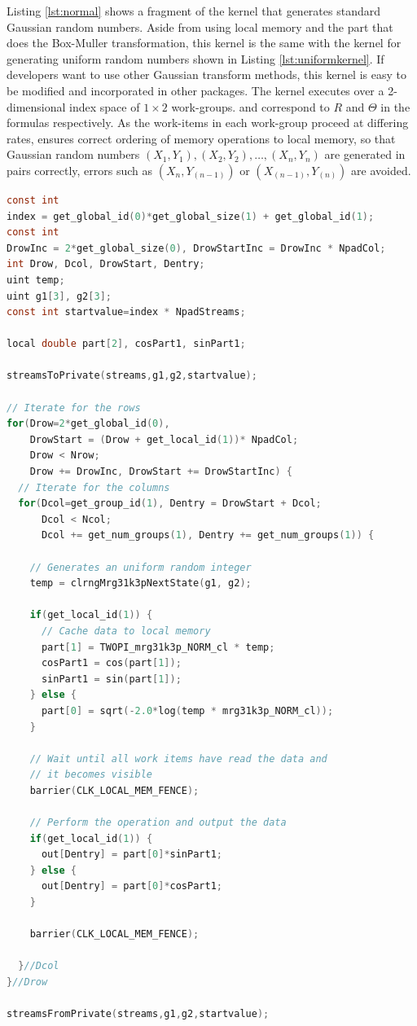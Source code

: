 \documentclass[article,nojss]{jss}\usepackage[]{graphicx}\usepackage[]{color}
\begin{document}
Listing \ref{lst:normal} shows a fragment of the kernel that generates standard Gaussian random numbers. Aside from using local memory and the part that does the Box-Muller transformation, this kernel is the same with the kernel for generating uniform random numbers shown in Listing \ref{lst:uniformkernel}. If developers want to use other Gaussian transform methods, this kernel is easy to be modified and incorporated in other  packages. The kernel executes over a 2-dimensional index space of $1 \times 2$ work-groups.  and  correspond to $R$ and $\Theta$ in the formulas respectively. As the work-items in each work-group proceed at differing rates,  ensures correct ordering of memory operations to local memory, so that Gaussian random numbers $(X_1,Y_1), (X_2,Y_2), \dots, (X_n,Y_n)$ are generated in pairs correctly, errors such as $(X_n, Y_{(n-1)})$ or $(X_{(n-1)}, Y_{(n)})$ are avoided.
%
\begin{framed}
\begin{lstlisting}[language=C,basicstyle=\small,caption={name},label={lst:normal}]
const int 
index = get_global_id(0)*get_global_size(1) + get_global_id(1);
const int 
DrowInc = 2*get_global_size(0), DrowStartInc = DrowInc * NpadCol;
int Drow, Dcol, DrowStart, Dentry;
uint temp;
uint g1[3], g2[3];
const int startvalue=index * NpadStreams;

local double part[2], cosPart1, sinPart1;

streamsToPrivate(streams,g1,g2,startvalue);

// Iterate for the rows
for(Drow=2*get_global_id(0), 
    DrowStart = (Drow + get_local_id(1))* NpadCol;
    Drow < Nrow; 
    Drow += DrowInc, DrowStart += DrowStartInc) {
  // Iterate for the columns
  for(Dcol=get_group_id(1), Dentry = DrowStart + Dcol;
      Dcol < Ncol;
      Dcol += get_num_groups(1), Dentry += get_num_groups(1)) {
    
    // Generates an uniform random integer
    temp = clrngMrg31k3pNextState(g1, g2);
    
    if(get_local_id(1)) {
      // Cache data to local memory
      part[1] = TWOPI_mrg31k3p_NORM_cl * temp;
      cosPart1 = cos(part[1]);
      sinPart1 = sin(part[1]);
    } else {
      part[0] = sqrt(-2.0*log(temp * mrg31k3p_NORM_cl));
    }
    
    // Wait until all work items have read the data and 
    // it becomes visible
    barrier(CLK_LOCAL_MEM_FENCE);
    
    // Perform the operation and output the data
    if(get_local_id(1)) {
      out[Dentry] = part[0]*sinPart1;
    } else {
      out[Dentry] = part[0]*cosPart1;
    }
    
    barrier(CLK_LOCAL_MEM_FENCE);
    
  }//Dcol
}//Drow

streamsFromPrivate(streams,g1,g2,startvalue);
\end{lstlisting}
\end{framed}
\end{document}
